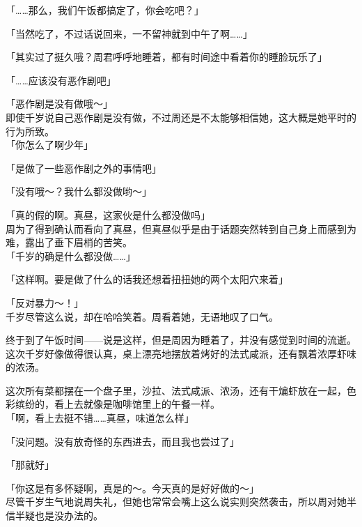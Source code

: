「……那么，我们午饭都搞定了，你会吃吧？」

「当然吃了，不过话说回来，一不留神就到中午了啊……」

「其实过了挺久哦？周君呼呼地睡着，都有时间途中看着你的睡脸玩乐了」

「……应该没有恶作剧吧」

「恶作剧是没有做哦～」\\

即使千岁说自己恶作剧是没有做，不过周还是不太能够相信她，这大概是她平时的行为所致。\\

「你怎么了啊少年」

「是做了一些恶作剧之外的事情吧」

「没有哦～？我什么都没做哟～」

「真的假的啊。真昼，这家伙是什么都没做吗」\\

周为了得到确认而看向了真昼，但真昼似乎是由于话题突然转到自己身上而感到为难，露出了垂下眉梢的苦笑。\\

「千岁的确是什么都没做……」

「这样啊。要是做了什么的话我还想着扭扭她的两个太阳穴来着」

「反对暴力～！」\\

千岁尽管这么说，却在哈哈笑着。周看着她，无语地叹了口气。\\

\vspace{2\baselineskip}

终于到了午饭时间——说是这样，但是周因为睡着了，并没有感觉到时间的流逝。\\

这次千岁好像做得很认真，桌上漂亮地摆放着烤好的法式咸派，还有飘着浓厚虾味的浓汤。

这次所有菜都摆在一个盘子里，沙拉、法式咸派、浓汤，还有干煸虾放在一起，色彩缤纷的，看上去就像是咖啡馆里上的午餐一样。\\

「啊，看上去挺不错……真昼，味道怎么样」

「没问题。没有放奇怪的东西进去，而且我也尝过了」

「那就好」

「你这是有多怀疑啊，真是的～。今天真的是好好做的～」\\

尽管千岁生气地说周失礼，但她也常常会嘴上这么说实则突然袭击，所以周对她半信半疑也是没办法的。

